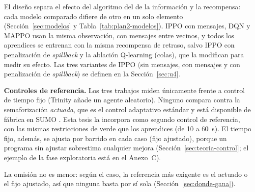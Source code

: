 El diseño separa el efecto del algoritmo del de la información y la recompensa: cada modelo comparado difiere de otro en un solo elemento (Sección~\ref{sec:modelos} y Tabla~\ref{tab:plan2-modelos}). IPPO con mensajes, DQN y MAPPO usan la misma observación, con mensajes entre vecinos, y todos los aprendices se entrenan con la misma recompensa de retraso, salvo IPPO con penalización de \textit{spillback} y la ablación Q-learning (colas), que la modifican para medir su efecto. Las tres variantes de IPPO (sin mensajes, con mensajes y con penalización de \textit{spillback}) se definen en la Sección~\ref{sec:u4}.

\noindent\textbf{Controles de referencia.} Los tres trabajos miden únicamente frente a control de tiempo fijo (Trinity añade un agente aleatorio). Ninguno compara contra la semaforización \textit{actuada}, que es el control adaptativo estándar y está disponible de fábrica en SUMO \citep{SUMO_TLS_Actuated}. Esta tesis la incorpora como segundo control de referencia, con las mismas restricciones de verde que los aprendices (de 10 a 60~s). El tiempo fijo, además, se ajusta por barrido en cada caso (fijo ajustado), porque un programa sin ajustar sobrestima cualquier mejora (Sección~\ref{sec:teoria-control}; el ejemplo de la fase exploratoria está en el Anexo~C).

La omisión no es menor: según el caso, la referencia más exigente es el actuado o el fijo ajustado, así que ninguna basta por sí sola (Sección~\ref{sec:donde-gana}).

